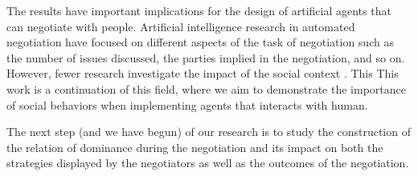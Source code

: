 \documentclass[runningheads,a4paper]{llncs}
\begin{document}
		The results have important implications for the design of artificial agents that can negotiate with people. Artificial
		intelligence research in automated negotiation have focused on different aspects of the task of negotiation such as the number of issues discussed, the parties implied in the negotiation, and so on. However, fewer research investigate the impact of the social context \cite{de2011effect,nazari2015opponent}. This This work is a continuation of this field, where we aim to demonstrate the importance of social behaviors when implementing agents that interacts with human. 
		
		The next step (and we have begun) of our research is to study the construction of the relation of dominance during the negotiation and its impact on both the strategies displayed by the negotiators as well as the outcomes of the negotiation.
		
\scriptsize{	
	
	}
\end{document}
